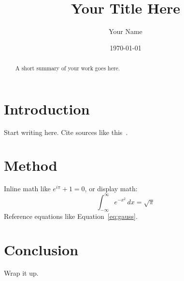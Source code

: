 \documentclass[11pt]{article}
\title{Your Title Here}
\author{Your Name}
\date{\today}
\begin{document}
\maketitle

\begin{abstract}
A short summary of your work goes here.
\end{abstract}

\section{Introduction}
Start writing here. Cite sources like this~\cite{knuth1984}.

\section{Method}
Inline math like $e^{i\pi} + 1 = 0$, or display math:
\begin{equation}
  \int_{-\infty}^{\infty} e^{-x^2}\,dx = \sqrt{\pi}
  \label{eq:gauss}
\end{equation}
Reference equations like Equation~\ref{eq:gauss}.

\section{Conclusion}
Wrap it up.



\end{document}

